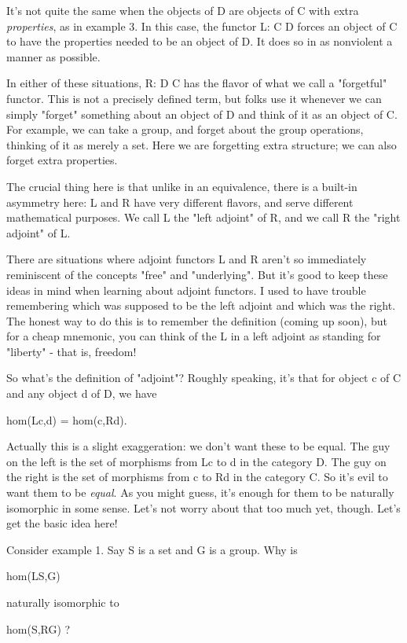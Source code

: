 It's not quite the same when the objects of D are objects of C with
extra \emph{properties}, as in example 3.  In this case, the functor
L: C \to  D forces an object of C to have the properties needed to be
an object of D.  It does so in as nonviolent a manner as possible.

In either of these situations, R: D \to  C has the flavor of what we
call a "forgetful" functor.  This is not a precisely defined
term, but folks use it whenever we can simply "forget"
something about an object of D and think of it as an object of C.  For
example, we can take a group, and forget about the group operations,
thinking of it as merely a set.  Here we are forgetting extra structure;
we can also forget extra properties.

The crucial thing here is that unlike in an equivalence, there is a
built-in asymmetry here: L and R have very different flavors, and serve
different mathematical purposes.  We call L the "left adjoint"
of R, and we call R the "right adjoint" of L.

There are situations where adjoint functors L and R aren't so
immediately reminiscent of the concepts "free" and
"underlying".  But it's good to keep these ideas in mind when
learning about adjoint functors.  I used to have trouble remembering
which was supposed to be the left adjoint and which was the right.  The
honest way to do this is to remember the definition (coming up soon),
but for a cheap mnemonic, you can think of the L in a left adjoint as
standing for "liberty" - that is, freedom!

So what's the definition of "adjoint"?  Roughly speaking, it's
that for object c of C and any object d of D, we have

                        hom(Lc,d) = hom(c,Rd).

Actually this is a slight exaggeration: we don't want these to be equal.
The guy on the left is the set of morphisms from Lc to d in the category
D.  The guy on the right is the set of morphisms from c to Rd in the
category C.  So it's evil to want them to be \emph{equal}.  As you might
guess, it's enough for them to be naturally isomorphic in some sense.
Let's not worry about that too much yet, though.  Let's get the basic
idea here!

Consider example 1.  Say S is a set and G is a group.  Why is

                        hom(LS,G) 

naturally isomorphic to

                        hom(S,RG) ?
  
